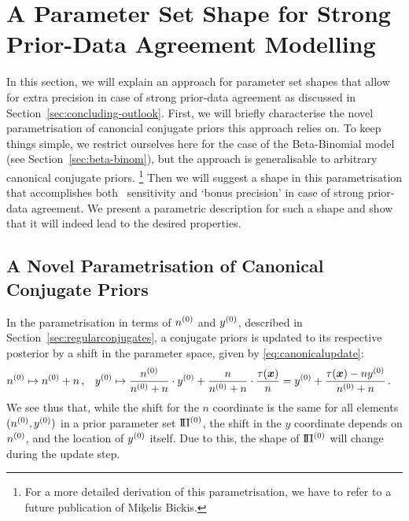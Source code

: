 


\section{A Parameter Set Shape for Strong Prior-Data Agreement Modelling}
\label{sec:boatshape}

In this section, we will explain an approach for parameter set shapes
that allow for extra precision in case of strong prior-data agreement
as discussed in Section~\ref{sec:concluding-outlook}.
First, we will briefly characterise the novel parametrisation of canoncial conjugate priors this approach relies on.
To keep things simple, we restrict ourselves here for the case of the Beta-Binomial model
(see Section~\ref{sec:beta-binom}),
but the approach is generalisable to arbitrary canonical conjugate priors.%
\footnote{For a more detailed derivation of this parametrisation,
we have to refer to a future publication of Mi\c{k}elis Bickis.}
Then we will suggest a shape in this parametrisation that accomplishes
both \pdc\ sensitivity and `bonus precision' in case of strong prior-data agreement.
We present a parametric description for such a shape
and show that it will indeed lead to the desired properties.

\subsection{A Novel Parametrisation of Canonical Conjugate Priors}
\label{sec:miksworld}

In the parametrisation in terms of $n^{(0)}$ and $y^{(0)}$, described in Section~\ref{sec:regularconjugates},
a conjugate priors is updated to its respective posterior by a shift in the parameter space,
given by \eqref{eq:canonicalupdate}:
\begin{align*}
n^{(0)} &\mapsto n^{(0)} + n\,, &
y^{(0)} &\mapsto \frac{n^{(0)}}{n^{(0)} + n} \cdot y^{(0)} + \frac{n}{n^{(0)} + n} \cdot \frac{\tau({\bm x})}{n} = y^{(0)} + \frac{\tau({\bm x})-ny^{(0)}}{n^{(0)}+n}\,.
\end{align*}
We see thus that, while the shift for the $n$ coordinate is the same for all elements $(n^{(0)},y^{(0)})$
in a prior parameter set $\text{I}\!\Pi^{(0)}$,
the shift in the $y$ coordinate depends on $n^{(0)}$, and the location of $y^{(0)}$ itself.
Due to this, the shape of $\text{I}\!\Pi^{(0)}$ will change during the update step.

